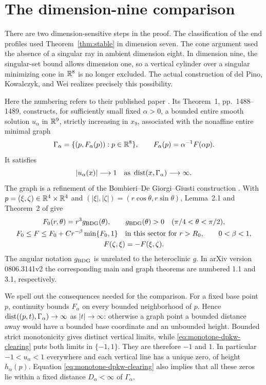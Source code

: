 \section{The dimension-nine comparison}\label{sec:dimension-nine}

There are two dimension-sensitive steps in the proof.  The classification
of the end profiles used Theorem~\ref{thm:stable} in dimension seven.
The cone argument used the absence of a singular ray in ambient dimension
eight.  In dimension nine, the singular-set bound allows dimension one,
so a vertical cylinder over a singular minimizing cone in $\mathbb R^8$
is no longer excluded.  The actual construction of del Pino, Kowalczyk,
and Wei realizes precisely this possibility.

Here the numbering refers to their published paper
\citep{DPKW2011}.  Its Theorem~1, pp.~1488--1489, constructs, for
sufficiently small fixed $\alpha>0$, a bounded entire smooth solution $u_\alpha$ in
$\mathbb R^9$, strictly increasing in $x_9$, associated with the nonaffine
entire minimal graph
\[
 \Gamma_\alpha=\{(p,F_\alpha(p)):p\in\mathbb R^8\},\qquad
 F_\alpha(p)=\alpha^{-1}F(\alpha p).
\]
It satisfies
\begin{equation}
 |u_\alpha(x)|\longrightarrow1
 \quad\text{as }\operatorname{dist}(x,\Gamma_\alpha)\longrightarrow\infty.
 \label{eq:monotone-dpkw-clearing}
\end{equation}
The graph is a refinement of the Bombieri--De Giorgi--Giusti construction
\citep{BDG1969}.  With
$p=(\xi,\zeta)\in\mathbb R^4\times\mathbb R^4$ and
$(|\xi|,|\zeta|)=(r\cos\theta,r\sin\theta)$, Lemma~2.1
and Theorem~2 of \citet[pp.~1492--1493]{DPKW2011} give
\begin{equation}
 \begin{gathered}
 F_0(r,\theta)=r^3g_{\rm BDG}(\theta),\qquad
 g_{\rm BDG}(\theta)>0\quad(\pi/4<\theta<\pi/2),\\
 F_0\le F\le F_0+C r^{-\beta}\min\{F_0,1\}
       \quad\text{in this sector for }r>R_0,
       \qquad 0<\beta<1,\\
 F(\zeta,\xi)=-F(\xi,\zeta).
 \end{gathered}
 \label{eq:monotone-dpkw-graph}
\end{equation}
The angular notation $g_{\rm BDG}$ is unrelated to the heteroclinic
$g$.  In arXiv version 0806.3141v2 the corresponding main and graph
theorems are numbered 1.1 and 3.1, respectively.

We spell out the consequences needed for the comparison.  For a fixed
base point $p$, continuity bounds $F_\alpha$ on every bounded
neighborhood of $p$.  Hence
$\operatorname{dist}((p,t),\Gamma_\alpha)\to\infty$ as $|t|\to\infty$:
otherwise a graph point a bounded distance away would have a bounded
base coordinate and an unbounded height.  Bounded strict monotonicity
gives distinct vertical limits, while
\eqref{eq:monotone-dpkw-clearing} puts both limits in $\{-1,1\}$.
They are therefore $-1$ and $1$.  In particular
$-1<u_\alpha<1$ everywhere and each vertical line has a unique zero,
of height $h_\alpha(p)$.  Equation
\eqref{eq:monotone-dpkw-clearing} also implies that all these zeros
lie within a fixed distance $D_\alpha<\infty$ of $\Gamma_\alpha$.

